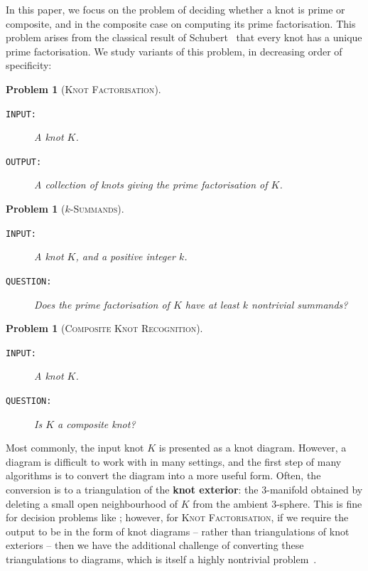 \documentclass[a4paper,UKenglish,cleveref, autoref, thm-restate]{lipics-v2021}
\newtheorem{problem}[theorem]{Problem}
\begin{document}
In this paper, we focus on the problem of deciding whether a knot is prime or composite, and in the composite case on computing its prime factorisation.
This problem arises from the classical result of Schubert~\cite{schubert49unique} that every knot has a unique prime factorisation. We study variants of this problem, in decreasing order of specificity:

\begin{problem}[\textsc{Knot Factorisation}]\label{problem:factorisation}
\hfill
\begin{description}
\item[\textup{\texttt{INPUT:}}]
A knot $K$.
\item[\textup{\texttt{OUTPUT:}}]
A collection of knots giving the prime factorisation of $K$.
\end{description}
\end{problem}

\begin{problem}[$k$-\textsc{Summands}]\label{problem:summands}
\hfill
\begin{description}
\item[\textup{\texttt{INPUT:}}]
A knot $K$, and a positive integer $k$.
\item[\textup{\texttt{QUESTION:}}]
Does the prime factorisation of $K$ have at least $k$ nontrivial summands?
\end{description}
\end{problem}

\begin{problem}[\textsc{Composite Knot Recognition}]\label{problem:composite}
\hfill
\begin{description}
\item[\textup{\texttt{INPUT:}}]
A knot $K$.
\item[\textup{\texttt{QUESTION:}}]
Is $K$ a composite knot?
\end{description}
\end{problem}

Most commonly, the input knot $K$ is presented as a knot diagram.
However, a diagram is difficult to work with in many settings, and the first step of many algorithms is to convert the diagram into a more useful form.
Often, the conversion is to a triangulation of the \textbf{knot exterior}:
the $3$-manifold obtained by deleting a small open neighbourhood of $K$ from the ambient $3$-sphere.
This is fine for decision problems like ;
however, for \textsc{Knot Factorisation}, if we require the output to be in the form of knot diagrams -- rather than triangulations of knot exteriors -- then we have
the additional challenge of converting these triangulations to diagrams, which is itself a highly nontrivial problem~\cite{dunfield2022diagram}.
\end{document}
